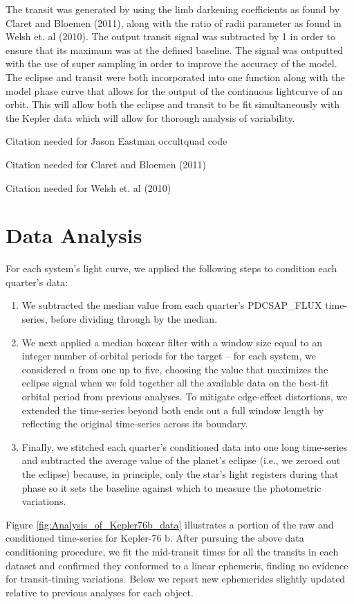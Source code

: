 \documentclass[manuscript]{aastex}
\begin{document}
    The transit was generated by using the limb darkening coefficients as found by Claret and Bloemen (2011), along with the ratio of radii parameter as found in Welsh et. al (2010). The output transit signal was subtracted by 1 in order to ensure that its maximum was at the defined baseline. The signal was outputted with the use of super sampling in order to improve the accuracy of the model. 
    The eclipse and transit were both incorporated into one function along with the model phase curve that allows for the output of the continuous lightcurve of an orbit. This will allow both the eclipse and transit to be fit simultaneously with the Kepler data which will allow for thorough analysis of variability. 


Citation needed for Jason Eastman occultquad code

Citation needed for Claret and Bloemen (2011)

Citation needed for  Welsh et. al (2010)


\section{Data Analysis}
For each system's light curve, we applied the following steps to condition each quarter's data:
\begin{enumerate}
\item We subtracted the median value from each quarter's PDCSAP\_FLUX time-series, before dividing through by the median.
\item We next applied a median boxcar filter with a window size equal to an integer number of orbital periods for the target -- for each system, we considered $n$ from one up to five, choosing the value that maximizes the eclipse signal when we fold together all the available data on the best-fit orbital period from previous analyses. To mitigate edge-effect distortions, we extended the time-series beyond both ends out a full window length by reflecting the original time-series across its boundary.
\item Finally, we stitched each quarter's conditioned data into one long time-series and subtracted the average value of the planet's eclipse (i.e., we zeroed out the eclipse) because, in principle, only the star's light registers during that phase so it sets the baseline against which to measure the photometric variations.
\end{enumerate}
Figure \ref{fig:Analysis_of_Kepler76b_data} illustrates a portion of the raw and conditioned time-series for Kepler-76 b. After pursuing the above data conditioning procedure, we fit the mid-transit times for all the transits in each dataset and confirmed they conformed to a linear ephemeris, finding no evidence for transit-timing variations. Below we report new ephemerides slightly updated relative to previous analyses for each object.
\end{document}
